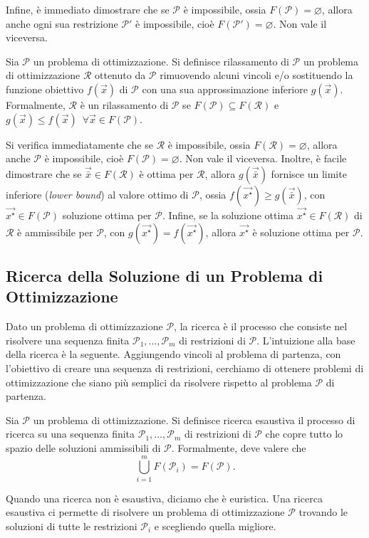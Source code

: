 Infine, è immediato dimostrare che se $\mathcal{P}$ è impossibile, ossia
$F(\mathcal{P}) = \varnothing$, allora anche ogni sua restrizione
$\mathcal{P}'$ è impossibile, cioè $F(\mathcal{P}') = \varnothing$. Non
vale il viceversa.

\begin{definition}[Rilassamento]
Sia $\mathcal{P}$ un problema di ottimizzazione. Si definisce rilassamento
di $\mathcal{P}$ un problema di ottimizzazione $\mathcal{R}$ ottenuto da
$\mathcal{P}$ rimuovendo alcuni vincoli e/o sostituendo la funzione
obiettivo $f(\vec{x})$ di $\mathcal{P}$ con una sua approssimazione
inferiore $g(\vec{x})$. Formalmente, $\mathcal{R}$ è un rilassamento di
$\mathcal{P}$ se $F(\mathcal{P}) \subseteq F(\mathcal{R})$ e $g(\vec{x})
\le f(\vec{x}) \,\,\, \forall \vec{x} \in F(\mathcal{P})$.
\end{definition}
Si verifica immediatamente che se $\mathcal{R}$ è impossibile, ossia
$F(\mathcal{R}) = \varnothing$, allora anche $\mathcal{P}$ è impossibile,
cioè $F(\mathcal{P}) = \varnothing$. Non vale il viceversa. Inoltre, è
facile dimostrare che se $\vec{\bar{x}} \in F(\mathcal{R})$ è ottima per
$\mathcal{R}$, allora $g(\vec{\bar{x}})$ fornisce un limite inferiore
(\textit{lower bound}) al valore ottimo di $\mathcal{P}$, ossia
$f(\vec{x^{\star}}) \ge g(\vec{\bar{x}})$, con $\vec{x^{\star}} \in
F(\mathcal{P})$ soluzione ottima per $\mathcal{P}$.  Infine, se la
soluzione ottima $\vec{x^{\star}} \in F(\mathcal{R})$ di $\mathcal{R}$ è
ammissibile per $\mathcal{P}$, con $g(\vec{x^{\star}}) =
f(\vec{x^{\star}})$, allora $\vec{x^{\star}}$ è soluzione ottima per
$\mathcal{P}$.

\subsection{Ricerca della Soluzione di un Problema di Ottimizzazione}
Dato un problema di ottimizzazione $\mathcal{P}$, la ricerca è il processo
che consiste nel risolvere una sequenza finita $\mathcal{P}_1, \ldots,
\mathcal{P}_m$ di restrizioni di $\mathcal{P}$. L'intuizione alla base
della ricerca è la seguente. Aggiungendo vincoli al problema di partenza,
con l'obiettivo di creare una sequenza di restrizioni, cerchiamo di ottenere
problemi di ottimizzazione che siano più semplici da risolvere rispetto al
problema $\mathcal{P}$ di partenza.

\begin{definition}
Sia $\mathcal{P}$ un problema di ottimizzazione. Si definisce ricerca
esaustiva il processo di ricerca su una sequenza finita
$\mathcal{P}_1, \ldots, \mathcal{P}_m$ di restrizioni di $\mathcal{P}$ che
copre tutto lo spazio delle soluzioni ammissibili di $\mathcal{P}$.
Formalmente, deve valere che
\[
    \bigcup_{i=1}^{m} F(\mathcal{P}_i) = F(\mathcal{P}).
\]
\end{definition}
Quando una ricerca non è esaustiva, diciamo che è euristica.
Una ricerca esaustiva ci permette di risolvere un problema di
ottimizzazione $\mathcal{P}$ trovando le soluzioni di tutte le restrizioni
$\mathcal{P}_i$ e scegliendo quella migliore.

